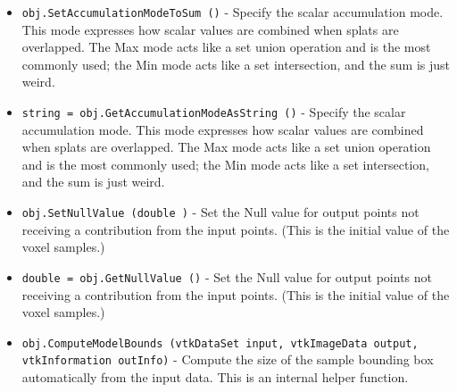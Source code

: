 \begin{itemize}
\item  \verb|obj.SetAccumulationModeToSum ()| -  Specify the scalar accumulation mode. This mode expresses how scalar
 values are combined when splats are overlapped. The Max mode acts
 like a set union operation and is the most commonly used; the Min
 mode acts like a set intersection, and the sum is just weird.

\item  \verb|string = obj.GetAccumulationModeAsString ()| -  Specify the scalar accumulation mode. This mode expresses how scalar
 values are combined when splats are overlapped. The Max mode acts
 like a set union operation and is the most commonly used; the Min
 mode acts like a set intersection, and the sum is just weird.

\item  \verb|obj.SetNullValue (double )| -  Set the Null value for output points not receiving a contribution from the
 input points. (This is the initial value of the voxel samples.)

\item  \verb|double = obj.GetNullValue ()| -  Set the Null value for output points not receiving a contribution from the
 input points. (This is the initial value of the voxel samples.)

\item  \verb|obj.ComputeModelBounds (vtkDataSet input, vtkImageData output, vtkInformation outInfo)| -  Compute the size of the sample bounding box automatically from the
 input data. This is an internal helper function.

\end{itemize}
